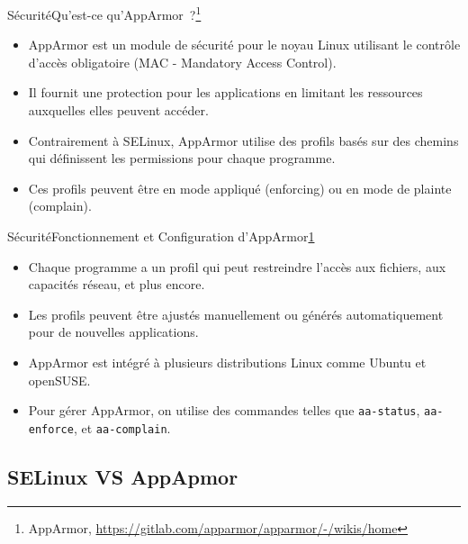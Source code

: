 \documentclass{beamer}
\begin{document}
    \begin{frame}{Sécurité}{Qu'est-ce qu'AppArmor~?\footnote{\label{apparmor}AppArmor, \url{https://gitlab.com/apparmor/apparmor/-/wikis/home}}}
        \begin{itemize}
            \item AppArmor est un module de sécurité pour le noyau Linux utilisant le contrôle d'accès obligatoire (MAC - Mandatory Access Control).
            \item Il fournit une protection pour les applications en limitant les ressources auxquelles elles peuvent accéder.
            \item Contrairement à SELinux, AppArmor utilise des profils basés sur des chemins qui définissent les permissions pour chaque programme.
            \item Ces profils peuvent être en mode appliqué (enforcing) ou en mode de plainte (complain).
        \end{itemize}
    \end{frame}

    \begin{frame}{Sécurité}{Fonctionnement et Configuration d'AppArmor\cref{apparmor}}
        \begin{itemize}
            \item Chaque programme a un profil qui peut restreindre l'accès aux fichiers, aux capacités réseau, et plus encore.
            \item Les profils peuvent être ajustés manuellement ou générés automatiquement pour de nouvelles applications.
            \item AppArmor est intégré à plusieurs distributions Linux comme Ubuntu et openSUSE.
            \item Pour gérer AppArmor, on utilise des commandes telles que \lstinline{aa-status}, \lstinline{aa-enforce}, et \lstinline{aa-complain}.
        \end{itemize}
    \end{frame}

    \subsection{SELinux VS AppApmor}\label{subsec:selinux-vs-apparmor}
\end{document}
